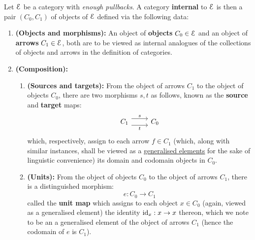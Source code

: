                     \begin{definition} \label{def: internal_categories}
                        Let $\mathcal{E}$ be a category with \textit{enough pullbacks}. A category \textbf{internal} to $\mathcal{E}$ is then a pair $(C_0, C_1)$ of objects of $\mathcal{E}$ defined via the following data:
                            \begin{enumerate}
                                \item \textbf{(Objects and morphisms):} An object of \textbf{objects} $C_0 \in \mathcal{E}$ and an object of \textbf{arrows} $C_1 \in \mathcal{E}$, both are to be viewed as internal analogues of the collections of objects and arrows in the definition of categories.
                                \item \textbf{(Composition):} 
                                    \begin{enumerate}
                                        \item \textbf{(Sources and targets):} From the object of arrows $C_1$ to the object of objects $C_0$, there are two morphisms $s, t$ as follows, known as the \textbf{source} and \textbf{target} maps:
                                            $$
                                                \begin{tikzcd}
                                                	{C_1} & {C_0}
                                                	\arrow["s", shift left=2, from=1-1, to=1-2]
                                                	\arrow["t"', shift right=2, from=1-1, to=1-2]
                                                \end{tikzcd}
                                            $$
                                        which, respectively, assign to each arrow $f \in C_1$ (which, along with similar instances, shall be viewed as a \href{https://ncatlab.org/nlab/show/generalized+element}{\underline{generalised elements}} for the sake of linguistic convenience) its domain and codomain objects in $C_0$.
                                        \item \textbf{(Units):} From the object of objects $C_0$ to the object of arrows $C_1$, there is a distinguished morphism:
                                            $$e: C_0 \to C_1$$
                                        called the \textbf{unit map} which assigns to each object $x \in C_0$ (again, viewed as a generalised element) the identity $\mathrm{id}_x: x \to x$ thereon, which we note to be an a generalised element of the object of arrows $C_1$ (hence the codomain of $e$ is $C_1$).

\end{enumerate}
\end{enumerate}
\end{definition}

